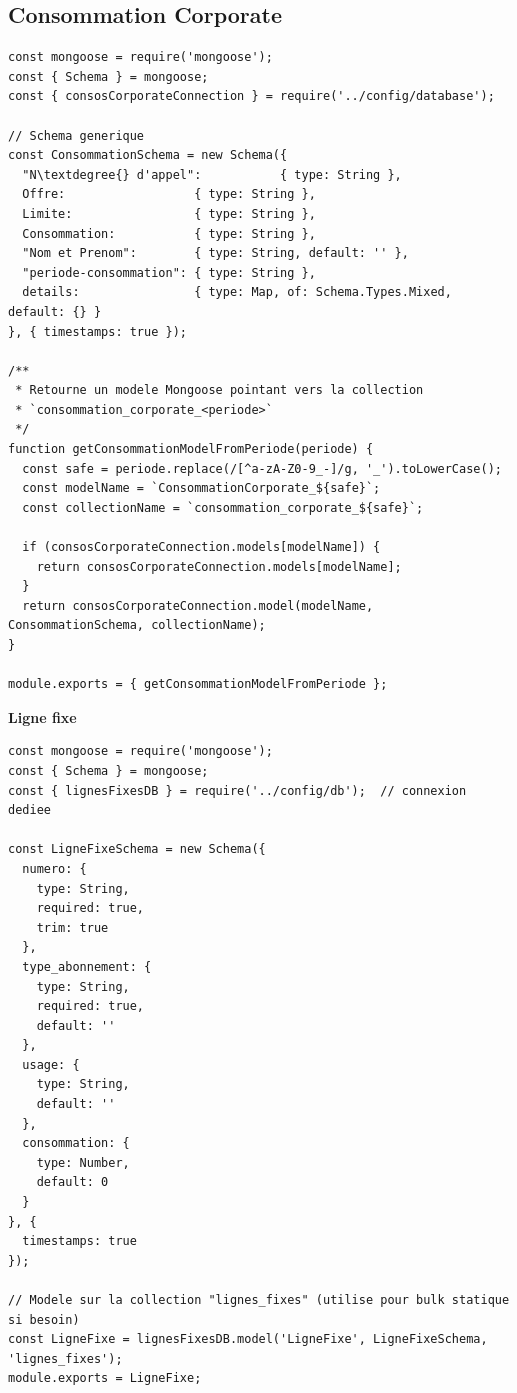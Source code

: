 \documentclass[a4paper,11pt]{report}
\begin{document}
\subsection{Consommation Corporate}
\begin{lstlisting}[caption=Modele de consommation corporate – models/consommationCorporateModel.js, label={lst:consommation_corporate_model}]
const mongoose = require('mongoose');
const { Schema } = mongoose;
const { consosCorporateConnection } = require('../config/database');

// Schema generique
const ConsommationSchema = new Schema({
  "N\textdegree{} d'appel":           { type: String },
  Offre:                  { type: String },
  Limite:                 { type: String },
  Consommation:           { type: String },
  "Nom et Prenom":        { type: String, default: '' },
  "periode-consommation": { type: String },
  details:                { type: Map, of: Schema.Types.Mixed, default: {} }
}, { timestamps: true });

/**
 * Retourne un modele Mongoose pointant vers la collection
 * `consommation_corporate_<periode>`
 */
function getConsommationModelFromPeriode(periode) {
  const safe = periode.replace(/[^a-zA-Z0-9_-]/g, '_').toLowerCase();
  const modelName = `ConsommationCorporate_${safe}`;
  const collectionName = `consommation_corporate_${safe}`;

  if (consosCorporateConnection.models[modelName]) {
    return consosCorporateConnection.models[modelName];
  }
  return consosCorporateConnection.model(modelName, ConsommationSchema, collectionName);
}

module.exports = { getConsommationModelFromPeriode };
\end{lstlisting}

\newpage
\textbf{Ligne fixe}
\begin{lstlisting}[caption=Modele de ligne fixe – models/ligneFixeModel.js, label={lst:ligne_fixe_model}]
const mongoose = require('mongoose');
const { Schema } = mongoose;
const { lignesFixesDB } = require('../config/db');  // connexion dediee

const LigneFixeSchema = new Schema({
  numero: {
    type: String,
    required: true,
    trim: true
  },
  type_abonnement: {
    type: String,
    required: true,
    default: ''
  },
  usage: {
    type: String,
    default: ''
  },
  consommation: {
    type: Number,
    default: 0
  }
}, {
  timestamps: true
});

// Modele sur la collection "lignes_fixes" (utilise pour bulk statique si besoin)
const LigneFixe = lignesFixesDB.model('LigneFixe', LigneFixeSchema, 'lignes_fixes');
module.exports = LigneFixe;
\end{lstlisting}
\end{document}
